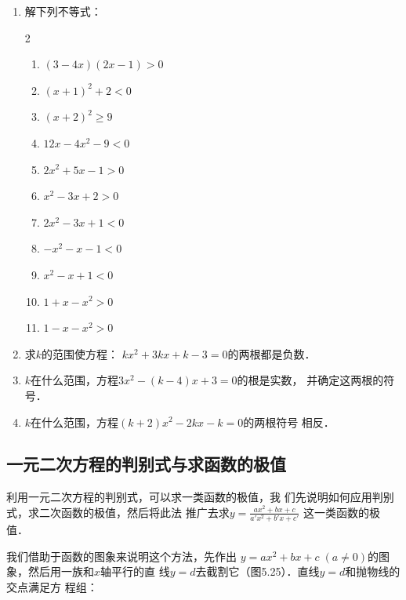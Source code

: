 \begin{ex}
\begin{enumerate}
    \item 解下列不等式：
\begin{multicols}{2}
\begin{enumerate}
    \item $(3-4x)(2x-1)>0$
    \item $(x+1)^2+2<0$
    \item $(x+2)^2\ge 9$
    \item $12x-4x^2-9<0$
    \item $2x^2+5x-1>0$
    \item $x^2-3x+2>0$
    \item $2x^2-3x+1<0$
    \item $-x^2-x-1<0$
    \item $x^2-x+1<0$
    \item $1+x-x^2>0$
    \item $1-x-x^2>0$
\end{enumerate}
\end{multicols}

\item 求$k$的范围使方程：
$kx^2+3kx+k-3=0$的两根都是负数．
\item $k$在什么范围，方程$3x^2-(k-4)x+3=0$的根是实数，
并确定这两根的符号．
\item $k$在什么范围，方程$(k+2)x^2-2kx-k=0$的两根符号
相反．
\end{enumerate}    
\end{ex}

\subsection{一元二次方程的判别式与求函数的极值}
利用一元二次方程的判别式，可以求一类函数的极值，我
们先说明如何应用判别式，求二次函数的极值，然后将此法
推广去求$y=\frac{ax^2+bx+c}{a'x^2+b'x+c'}$
这一类函数的极值．

我们借助于函数的图象来说明这个方法，先作出
$y=ax^2+bx+c\; (a\ne 0)$的图象，然后用一族和$x$轴平行的直
线$y=d$去截割它（图5.25）．直线$y=d$和抛物线的交点满足方
程组：

